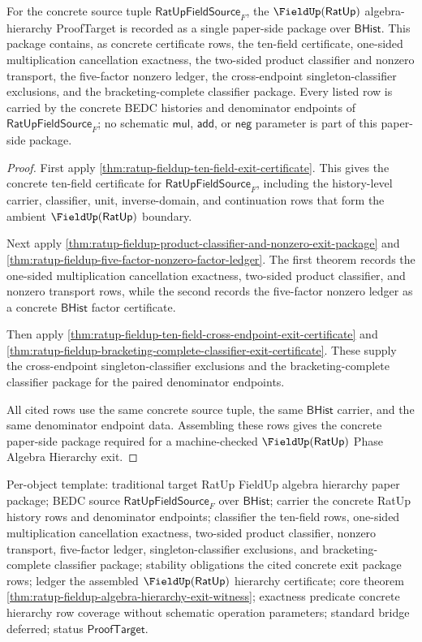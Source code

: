 \begin{theorem}
\label{thm:ratup-fieldup-algebra-hierarchy-exit-witness}
For the concrete source tuple $\mathsf{RatUpFieldSource}_F$, the
$\FieldUp(\mathsf{RatUp})$ algebra-hierarchy ProofTarget is recorded as a
single paper-side package over $\mathsf{BHist}$. This package contains, as
concrete certificate rows, the ten-field certificate, one-sided multiplication
cancellation exactness, the two-sided product classifier and nonzero transport,
the five-factor nonzero ledger, the cross-endpoint singleton-classifier
exclusions, and the bracketing-complete classifier package. Every listed row is
carried by the concrete BEDC histories and denominator endpoints of
$\mathsf{RatUpFieldSource}_F$; no schematic $\mathsf{mul}$, $\mathsf{add}$, or
$\mathsf{neg}$ parameter is part of this paper-side package.
\end{theorem}
\begin{proof}
First apply \autoref{thm:ratup-fieldup-ten-field-exit-certificate}. This gives
the concrete ten-field certificate for $\mathsf{RatUpFieldSource}_F$, including
the history-level carrier, classifier, unit, inverse-domain, and continuation
rows that form the ambient $\FieldUp(\mathsf{RatUp})$ boundary.

Next apply
\autoref{thm:ratup-fieldup-product-classifier-and-nonzero-exit-package} and
\autoref{thm:ratup-fieldup-five-factor-nonzero-factor-ledger}. The first theorem
records the one-sided multiplication cancellation exactness, two-sided product
classifier, and nonzero transport rows, while the second records the
five-factor nonzero ledger as a concrete $\mathsf{BHist}$ factor certificate.

Then apply
\autoref{thm:ratup-fieldup-ten-field-cross-endpoint-exit-certificate} and
\autoref{thm:ratup-fieldup-bracketing-complete-classifier-exit-certificate}. These
supply the cross-endpoint singleton-classifier exclusions and the
bracketing-complete classifier package for the paired denominator endpoints.

All cited rows use the same concrete source tuple, the same $\mathsf{BHist}$
carrier, and the same denominator endpoint data. Assembling these rows gives the
concrete paper-side package required for a machine-checked
$\FieldUp(\mathsf{RatUp})$ Phase Algebra Hierarchy exit.
\end{proof}

Per-object template: traditional target RatUp FieldUp algebra hierarchy paper
package; BEDC source $\mathsf{RatUpFieldSource}_F$ over $\mathsf{BHist}$;
carrier the concrete RatUp history rows and denominator endpoints; classifier
the ten-field rows, one-sided multiplication cancellation exactness, two-sided
product classifier, nonzero transport, five-factor ledger,
singleton-classifier exclusions, and bracketing-complete classifier package;
stability obligations the cited concrete exit package rows; ledger the
assembled $\FieldUp(\mathsf{RatUp})$ hierarchy certificate; core theorem
\autoref{thm:ratup-fieldup-algebra-hierarchy-exit-witness}; exactness predicate
concrete hierarchy row coverage without schematic operation parameters;
standard bridge deferred; status $\mathsf{ProofTarget}$.
